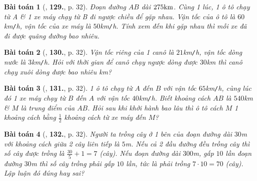 \documentclass{article}
\numberwithin{equation}{section}
\newtheorem{baitoan}{Bài toán}
\begin{document}
\begin{baitoan}[\cite{Tuyen_Toan_7}, \textbf{129.}, p. 32]
	Đoạn đường $AB$ dài $\rm275km$. Cùng 1 lúc, 1 ô tô chạy từ A \& 1 xe máy chạy từ B đi ngược chiều để gặp nhau. Vận tốc của ô tô là $60$\emph{km\texttt{/}h}, vận tốc của xe máy là $50$\emph{km\texttt{/}h}. Tính xem đến khi gặp nhau thì mỗi xe đã đi được quãng đường bao nhiêu.
\end{baitoan}

\begin{baitoan}[\cite{Tuyen_Toan_7}, \textbf{130.}, p. 32]
	Vận tốc riêng của 1 canô là $21$\emph{km\texttt{/}h}, vận tốc dòng nước là $3$\emph{km\texttt{/}h}. Hỏi với thời gian để canô chạy ngược dòng được $30$\emph{km} thì canô chạy xuôi dòng được bao nhiêu \emph{km}?
\end{baitoan}

\begin{baitoan}[\cite{Tuyen_Toan_7}, \textbf{131.}, p. 32]
	1 ô tô chạy từ $A$ đến $B$ với vận tốc $65$\emph{km\texttt{/}h}, cùng lúc đó 1 xe máy chạy từ $B$ đến $A$ với vận tốc $40$\emph{km\texttt{/}h}. Biết khoảng cách $AB$ là $540$\emph{km} \& $M$ là trung điểm của $AB$. Hỏi sau khi khởi hành bao lâu thì ô tô cách $M$ 1 khoảng cách bằng $\frac{1}{2}$ khoảng cách từ xe máy đến $M$?
\end{baitoan}

\begin{baitoan}[\cite{Tuyen_Toan_7}, \textbf{132.}, p. 32]
	Người ta trồng cây ở 1 bên của đoạn đường dài $30$\emph{m} với khoảng cách giữa 2 cây liên tiếp là $5$\emph{m}. Nếu cả 2 đầu đường đều trồng cây thì số cây được trồng là $\frac{30}{5} + 1 = 7$ (cây). Nếu đoạn đường dài $300$\emph{m}, gấp $10$ lần đoạn đường $30$\emph{m} thì số cây trồng phải gấp $10$ lần, tức là phải trồng $7\cdot 10 = 70$ (cây). Lập luận đó đúng hay sai?
\end{baitoan}

\end{document}

